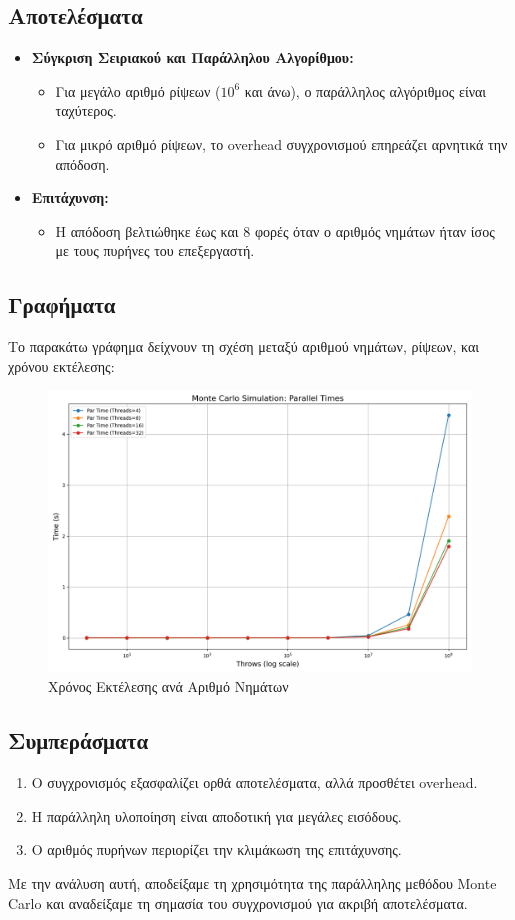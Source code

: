 \documentclass{article}
\begin{document}
\subsection*{Αποτελέσματα}
\begin{itemize}
    \item \textbf{Σύγκριση Σειριακού και Παράλληλου Αλγορίθμου:}
    \begin{itemize}
        \item Για μεγάλο αριθμό ρίψεων ($10^6$ και άνω), ο παράλληλος αλγόριθμος είναι ταχύτερος.
        \item Για μικρό αριθμό ρίψεων, το overhead συγχρονισμού επηρεάζει αρνητικά την απόδοση.
    \end{itemize}
    \item \textbf{Επιτάχυνση:}
    \begin{itemize}
        \item Η απόδοση βελτιώθηκε έως και 8 φορές όταν ο αριθμός νημάτων ήταν ίσος με τους πυρήνες του επεξεργαστή.
    \end{itemize}
\end{itemize}
\subsection*{Γραφήματα}
Το παρακάτω γράφημα δείχνουν τη σχέση μεταξύ αριθμού νημάτων, ρίψεων, και χρόνου εκτέλεσης:
\newpage
\begin{figure}[h]
    \centering
    \includegraphics[width=1\textwidth]{monte_carlo_results.png}
    \caption{Χρόνος Εκτέλεσης ανά Αριθμό Νημάτων}
\end{figure}
\subsection*{Συμπεράσματα}
\begin{enumerate}
    \item Ο συγχρονισμός εξασφαλίζει ορθά αποτελέσματα, αλλά προσθέτει overhead.
    \item Η παράλληλη υλοποίηση είναι αποδοτική για μεγάλες εισόδους.
    \item Ο αριθμός πυρήνων περιορίζει την κλιμάκωση της επιτάχυνσης.
\end{enumerate}
Με την ανάλυση αυτή, αποδείξαμε τη χρησιμότητα της παράλληλης μεθόδου Monte Carlo και αναδείξαμε τη σημασία του συγχρονισμού για ακριβή αποτελέσματα.
\end{document}
